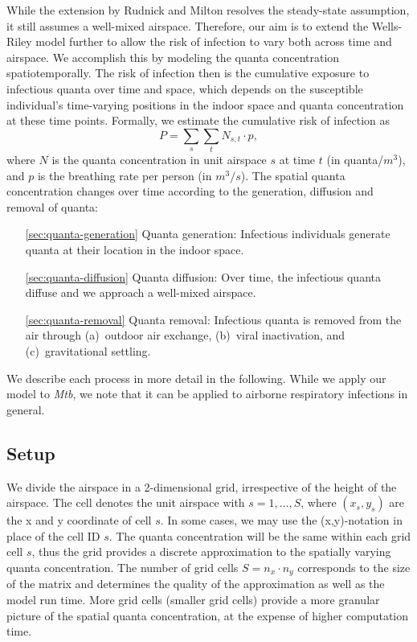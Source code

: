 \documentclass[fleqn,11pt]{wlscirep_supp}
\begin{document}
While the extension by Rudnick and Milton resolves the steady-state assumption, it still assumes a well-mixed airspace. Therefore, our aim is to extend the Wells-Riley model further to allow the risk of infection to vary both across time and airspace. We accomplish this by modeling the quanta concentration spatiotemporally. The risk of infection then is the cumulative exposure to infectious quanta over time and space, which depends on the susceptible individual's time-varying positions in the indoor space and quanta concentration at these time points. Formally, we estimate the cumulative risk of infection as 
\begin{equation}
    P = \sum_s \sum_t N_{s,t} \cdot p,
\end{equation}
where $N$ is the quanta concentration in unit airspace $s$ at time $t$ (in quanta/$m^3$), and $p$ is the breathing rate per person (in $m^3/s$). The spatial quanta concentration changes over time according to the generation, diffusion and removal of quanta: 
\begin{itemize}
    \item[\ref{sec:quanta-generation}] Quanta generation: Infectious individuals generate quanta at their location in the indoor space. 
    \item[\ref{sec:quanta-diffusion}] Quanta diffusion: Over time, the infectious quanta diffuse and we approach a well-mixed airspace. 
    \item[\ref{sec:quanta-removal}] Quanta removal: Infectious quanta is removed from the air through (a)~outdoor air exchange, (b)~viral inactivation, and (c)~gravitational settling. 
\end{itemize}
We describe each process in more detail in the following. While we apply our model to \emph{Mtb}, we note that it can be applied to airborne respiratory infections in general.

\subsection{Setup}

We divide the airspace in a 2-dimensional grid, irrespective of the height of the airspace. The cell denotes the unit airspace with $s = 1, \dots, S$, where $(x_s, y_s)$ are the x and y coordinate of cell $s$. In some cases, we may use the (x,y)-notation in place of the cell ID $s$. The quanta concentration will be the same within each grid cell $s$, thus the grid provides a discrete approximation to the spatially varying quanta concentration. The number of grid cells $S = n_x \cdot n_y$ corresponds to the size of the matrix and determines the quality of the approximation as well as the model run time. More grid cells (smaller grid cells) provide a more granular picture of the spatial quanta concentration, at the expense of higher computation time. 
\end{document}
